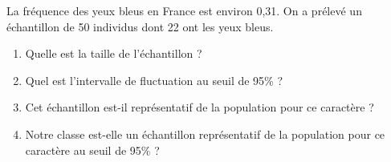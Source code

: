 
La fréquence des yeux bleus en France est environ 0,31. On a prélevé un échantillon de 50 individus dont 22 ont les yeux bleus.
\begin{enumerate}
\item Quelle est la taille de l'échantillon ?
\item  Quel est l'intervalle de fluctuation au seuil de 95\% ?
\item  Cet échantillon est-il représentatif de la population pour ce caractère ?
\item  Notre classe est-elle un échantillon représentatif de la population pour ce caractère au seuil de 95\% ?
\end{enumerate}